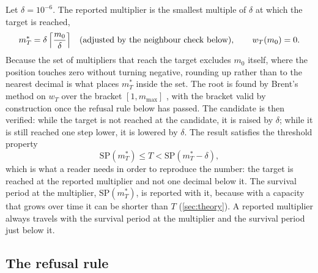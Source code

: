 Let $\delta=10^{-6}$. The reported multiplier is the smallest multiple of $\delta$ at which the target is reached,
\begin{equation}
m^\ast_T=\delta\,\Bigl\lceil \frac{m_0}{\delta}\Bigr\rceil\quad\text{(adjusted by the neighbour check below)},\qquad w_T(m_0)=0.
\label{eq:rounding}
\end{equation}
Because the set of multipliers that reach the target excludes $m_0$ itself, where the position touches zero without turning negative, rounding up rather than to the nearest decimal is what places $m^\ast_T$ inside the set. The root is found by Brent's method on $w_T$ over the bracket $[1,m_{\max}]$ \citep{scipybrentq,virtanen2020}, with the bracket valid by construction once the refusal rule below has passed. The candidate is then verified: while the target is not reached at the candidate, it is raised by $\delta$; while it is still reached one step lower, it is lowered by $\delta$. The result satisfies the threshold property
\begin{equation}
\mathrm{SP}(m^\ast_T)\le T<\mathrm{SP}(m^\ast_T-\delta),
\label{eq:threshold}
\end{equation}
which is what a reader needs in order to reproduce the number: the target is reached at the reported multiplier and not one decimal below it. The survival period at the multiplier, $\mathrm{SP}(m^\ast_T)$, is reported with it, because with a capacity that grows over time it can be shorter than $T$ (\cref{sec:theory}). A reported multiplier always travels with the survival period at the multiplier and the survival period just below it.

\subsection{The refusal rule}

